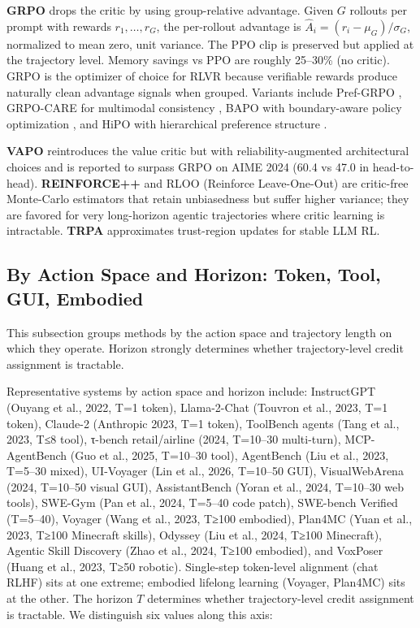 \documentclass{article}
\begin{document}
\textbf{GRPO} \citep{shao20242024} drops the critic by using group-relative advantage. Given \(G\) rollouts per prompt with rewards \(r_1, \ldots, r_G\), the per-rollout advantage is \(\hat A_i = (r_i - \mu_G)/\sigma_G\), normalized to mean zero, unit variance. The PPO clip is preserved but applied at the trajectory level. Memory savings vs PPO are roughly 25--30\% (no critic). GRPO is the optimizer of choice for RLVR because verifiable rewards produce naturally clean advantage signals when grouped. Variants include Pref-GRPO \citep{wang20252025}, GRPO-CARE for multimodal consistency \citep{chen20252025}, BAPO with boundary-aware policy optimization \citep{liu20262026}, and HiPO with hierarchical preference structure \citep{kachroo20262026}.

\textbf{VAPO} \citep{yu20252025} reintroduces the value critic but with reliability-augmented architectural choices and is reported to surpass GRPO on AIME 2024 (60.4 vs 47.0 in head-to-head). \textbf{REINFORCE++} and RLOO (Reinforce Leave-One-Out) are critic-free Monte-Carlo estimators that retain unbiasedness but suffer higher variance; they are favored for very long-horizon agentic trajectories where critic learning is intractable. \textbf{TRPA} \citep{su20252025} approximates trust-region updates for stable LLM RL.

\subsection{By Action Space and Horizon: Token, Tool, GUI, Embodied}\label{by-action-space-and-horizon-token-tool-gui-embodied}

This subsection groups methods by the action space and trajectory length on which they operate. Horizon strongly determines whether trajectory-level credit assignment is tractable.

Representative systems by action space and horizon include: InstructGPT (Ouyang et al., 2022, T=1 token), Llama-2-Chat (Touvron et al., 2023, T=1 token), Claude-2 (Anthropic 2023, T=1 token), ToolBench agents (Tang et al., 2023, T≤8 tool), τ-bench retail/airline (2024, T=10--30 multi-turn), MCP-AgentBench (Guo et al., 2025, T=10--30 tool), AgentBench (Liu et al., 2023, T=5--30 mixed), UI-Voyager (Lin et al., 2026, T=10--50 GUI), VisualWebArena (2024, T=10--50 visual GUI), AssistantBench (Yoran et al., 2024, T=10--30 web tools), SWE-Gym (Pan et al., 2024, T=5--40 code patch), SWE-bench Verified (T=5--40), Voyager (Wang et al., 2023, T≥100 embodied), Plan4MC (Yuan et al., 2023, T≥100 Minecraft skills), Odyssey (Liu et al., 2024, T≥100 Minecraft), Agentic Skill Discovery (Zhao et al., 2024, T≥100 embodied), and VoxPoser (Huang et al., 2023, T≥50 robotic). Single-step token-level alignment (chat RLHF) sits at one extreme; embodied lifelong learning (Voyager, Plan4MC) sits at the other. The horizon \(T\) determines whether trajectory-level credit assignment is tractable. We distinguish six values along this axis:
\end{document}
